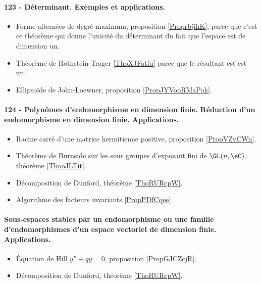 \paragraph{123 - Déterminant. Exemples et applications.}
\begin{itemize}
    \item Forme alternées de degré maximum, proposition \ref{ProprbjihK}, parce que c'est ce théorème qui donne l'unicité du déterminant du fait que l'espace est de dimension un.
    \item Théorème de Rothstein-Trager \ref{ThoXJFatfu} parce que le résultant est est un.
    \item Ellipsoïde de John-Loewner, proposition \ref{PropJYVooRMaPok}.
\end{itemize}
\paragraph{124 - Polynômes d’endomorphisme en dimension finie. Réduction d’un endomorphisme en dimension finie. Applications.}
\begin{itemize}
    \item Racine carré d'une matrice hermitienne positive, proposition \ref{PropVZvCWn}.
    \item Théorème de Burnside sur les sous groupes d'exposant fini de \( \GL(n,\eC)\), théorème \ref{ThooJLTit}.
    \item Décomposition de Dunford, théorème \ref{ThoRURcpW}. 
    \item Algorithme des facteurs invariants \ref{PropPDfCqee}.
\end{itemize}
\paragraph{Sous-espaces stables par un endomorphisme ou une famille d’endomorphismes d’un espace vectoriel de dimension finie. Applications.}
\begin{itemize}
    \item Équation de Hill \( y''+qy=0\), proposition \ref{PropGJCZcjR}.
    \item Décomposition de Dunford, théorème \ref{ThoRURcpW}. 
\end{itemize}
